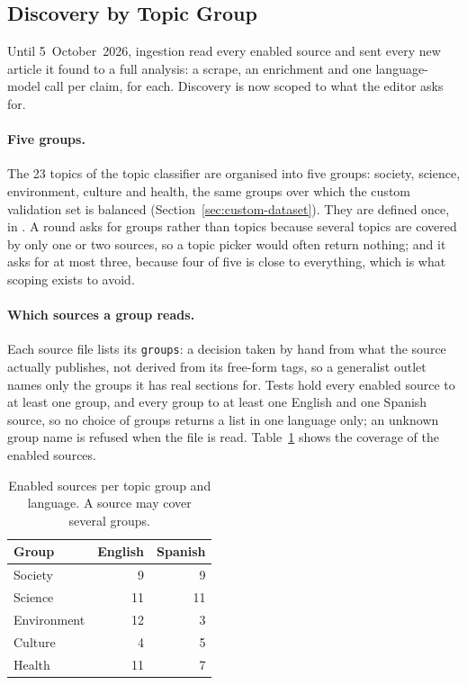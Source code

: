
\subsection{Discovery by Topic Group}
\label{subsec:scraping-groups}

Until 5~October~2026, ingestion read every enabled source and sent
every new article it found to a full analysis: a scrape, an enrichment
and one language-model call per claim, for each. Discovery is now
scoped to what the editor asks for.

\paragraph{Five groups.} The 23 topics of the topic classifier are
organised into five groups: society, science, environment, culture and
health, the same groups over which the custom validation set is
balanced (Section~\ref{sec:custom-dataset}). They are defined once, in
. A round asks for groups rather than topics
because several topics are covered by only one or two sources, so a
topic picker would often return nothing; and it asks for at most three,
because four of five is close to everything, which is what scoping
exists to avoid.

\paragraph{Which sources a group reads.} Each source file lists its
\texttt{groups}: a decision taken by hand from what the source actually
publishes, not derived from its free-form tags, so a generalist outlet
names only the groups it has real sections for. Tests hold every
enabled source to at least one group, and every group to at least one
English and one Spanish source, so no choice of groups returns a list
in one language only; an unknown group name is refused when the file
is read. Table~\ref{tab:group-coverage} shows the coverage of the
enabled sources.

\begin{table}[ht]
\centering
\small
\caption{Enabled sources per topic group and language. A source may
cover several groups.}
\label{tab:group-coverage}
\begin{tabular}{@{}lrr@{}}
\toprule
Group & English & Spanish \\
\midrule
Society     &  9 & 9 \\
Science     & 11 & 11 \\
Environment & 12 & 3 \\
Culture     &  4 & 5 \\
Health      & 11 & 7 \\
\bottomrule
\end{tabular}
\end{table}

